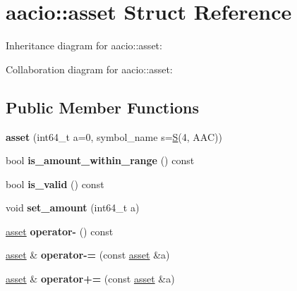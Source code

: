 \hypertarget{structaacio_1_1asset}{}\section{aacio\+:\+:asset Struct Reference}
\label{structaacio_1_1asset}


Inheritance diagram for aacio\+:\+:asset\+:


Collaboration diagram for aacio\+:\+:asset\+:
\subsection*{Public Member Functions}
\begin{DoxyCompactItemize}
\item 
\mbox{\label{structaacio_1_1asset_aa958d356c13a1718b64bf25fe1b7c9e9}} 
{\bfseries asset} (int64\+\_\+t a=0, symbol\+\_\+name s=\mbox{\hyperlink{struct_s}{S}}(4, A\+AC))
\item 
\mbox{\label{structaacio_1_1asset_a772d6bda058af7267d8c42296b87aae3}} 
bool {\bfseries is\+\_\+amount\+\_\+within\+\_\+range} () const
\item 
\mbox{\label{structaacio_1_1asset_a7c63d41facd2c4c0f09ebd1a8fdc131c}} 
bool {\bfseries is\+\_\+valid} () const
\item 
\mbox{\label{structaacio_1_1asset_acefc7c4653bee108dc753ec32d44115d}} 
void {\bfseries set\+\_\+amount} (int64\+\_\+t a)
\item 
\mbox{\label{structaacio_1_1asset_a3de8c0cd970cfa64193d08edbec02795}} 
\mbox{\hyperlink{structaacio_1_1asset}{asset}} {\bfseries operator-\/} () const
\item 
\mbox{\label{structaacio_1_1asset_abe7bf0941465ffb6d7924013607345ef}} 
\mbox{\hyperlink{structaacio_1_1asset}{asset}} \& {\bfseries operator-\/=} (const \mbox{\hyperlink{structaacio_1_1asset}{asset}} \&a)
\item 
\mbox{\label{structaacio_1_1asset_acb0ed91abccad9f75dc83fafaa32a0ec}} 
\mbox{\hyperlink{structaacio_1_1asset}{asset}} \& {\bfseries operator+=} (const \mbox{\hyperlink{structaacio_1_1asset}{asset}} \&a)

\end{DoxyCompactItemize}
